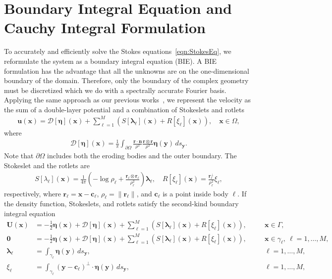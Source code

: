\documentclass[3p]{elsarticle}
\newcommand{\bd}{{\partial}}
\newcommand{\cc}{{\mathbf{c}}}
\newcommand{\DDD}{{\boldsymbol{\mathcal D}}}
\newcommand{\eeta}{{\boldsymbol\eta}}
\newcommand{\llambda}{{\boldsymbol\lambda}}
\newcommand{\nn}{{\mathbf{n}}}
\newcommand{\rr}{{\mathbf{r}}}
\newcommand{\uu}{{\mathbf{u}}}
\newcommand{\UU}{{\mathbf{U}}}
\newcommand{\xx}{{\mathbf{x}}}
\newcommand{\yy}{{\mathbf{y}}}
\begin{document}
\section{Boundary Integral Equation and Cauchy Integral Formulation}
\label{sec:DLP}
To accurately and efficiently solve the Stokes
  equations~\eqref{eqn:StokesEq}, we reformulate the system as a
  boundary integral equation (BIE). A BIE formulation has the advantage
  that all the unknowns are on the one-dimensional boundary of the
  domain. Therefore, only the boundary of the complex geometry must be
  discretized which we do with a spectrally accurate Fourier basis.
  Applying the same approach as our previous
  works~\citep{quaife2018boundary, chiu2020viscous}, we represent the
  velocity as the sum of a double-layer potential and a combination of
  Stokeslets and rotlets~\cite{pow-mir1987}
\begin{align}
  \uu(\xx) = \DDD[\eeta](\xx) + \sum_{\ell=1}^{M}\left(
    S[\llambda_\ell](\xx) + R[\xi_\ell](\xx)\right), 
    \quad \xx \in \Omega,
  \label{eqn:velocity}
\end{align}
where 
\begin{align}
  \DDD[\eeta](\xx) = \frac{1}{\pi}\int_{\bd\Omega} 
  \frac{\rr \cdot \nn}{\rho^2} \frac{\rr \otimes \rr}{\rho^2}
  \eeta(\yy) \, ds_\yy.
  \label{eqn:velocityDLP}
\end{align}
\todo{Maybe define what $\rr$ is.}
Note that $\bd\Omega$ includes both the eroding bodies and the outer
boundary. The Stokeslet and the rotlets are
\begin{align}
  S[\lambda_\ell](\xx) = \frac{1}{4\pi} \left(-\log \rho_\ell +
  \frac{\rr_\ell \otimes \rr_\ell}{\rho_\ell^2} \right) \llambda_\ell,
  \quad
  R[\xi_\ell](\xx) = \frac{\rr_\ell^\perp}{\rho_\ell^2}\xi_\ell,
\end{align}
respectively, where $\rr_\ell = \xx - \cc_\ell$, $\rho_\ell =
\|\rr_\ell\|$, and $\cc_\ell$ is a point inside body $\ell$. If the
density function, Stokeslets, and rotlets satisfy the second-kind
boundary integral equation
\begin{subequations}
  \label{eqn:FredBIE}
  \begin{alignat}{3}
    \UU(\xx) &= -\frac{1}{2}\eeta(\xx) + \DDD[\eeta](\xx) + 
      \sum_{\ell=1}^{M}\left(S[\llambda_\ell](\xx) + R[\xi_\ell](\xx)\right), 
      \quad &&\xx \in \Gamma, \\
    \mathbf{0} &= -\frac{1}{2}\eeta(\xx) + \DDD[\eeta](\xx) + 
      \sum_{\ell=1}^{M}\left(S[\llambda_\ell](\xx) + R[\xi_\ell](\xx)\right), 
      &&\xx \in \gamma_\ell, \: \ell = 1,\ldots,M, \\
    \llambda_\ell &= \int_{\gamma_\ell} \eeta(\yy) \, ds_\yy, 
      &&\ell = 1,\ldots,M, \\
    \xi_\ell &= \int_{\gamma_\ell} (\yy - \cc_\ell)^\perp \cdot 
      \eeta(\yy) \, ds_\yy, &&\ell = 1,\ldots,M,
  \end{alignat}
\end{subequations}
\end{document}
